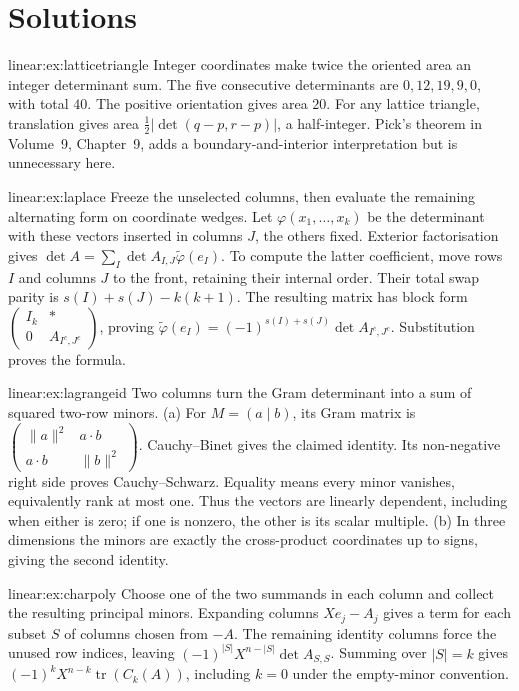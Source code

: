 \section{Solutions}
\begin{solution}{linear:ex:latticetriangle}
\idea Integer coordinates make twice the oriented area an integer determinant sum.
\writeup The five consecutive determinants are $0,12,19,9,0$, with total $40$. The positive orientation gives area $20$. For any lattice triangle, translation gives area $\tfrac12|\det(q-p,r-p)|$, a half-integer. Pick's theorem in Volume~9, Chapter~9, adds a boundary-and-interior interpretation but is unnecessary here.
\end{solution}
\begin{solution}{linear:ex:laplace}
\idea Freeze the unselected columns, then evaluate the remaining alternating form on coordinate wedges.
\writeup Let $\varphi(x_1,\ldots,x_k)$ be the determinant with these vectors inserted in columns $J$, the others fixed. Exterior factorisation gives $\det A=\sum_I\det A_{I,J}\tilde\varphi(e_I)$. To compute the latter coefficient, move rows $I$ and columns $J$ to the front, retaining their internal order. Their total swap parity is $s(I)+s(J)-k(k+1)$. The resulting matrix has block form $\begin{pmatrix}I_k&*\\0&A_{I^c,J^c}\end{pmatrix}$, proving $\tilde\varphi(e_I)=(-1)^{s(I)+s(J)}\det A_{I^c,J^c}$. Substitution proves the formula.
\end{solution}
\begin{solution}{linear:ex:lagrangeid}
\idea Two columns turn the Gram determinant into a sum of squared two-row minors.
\writeup (a) For $M=(a\mid b)$, its Gram matrix is $\begin{pmatrix}\|a\|^2&a\cdot b\\a\cdot b&\|b\|^2\end{pmatrix}$. Cauchy--Binet gives the claimed identity. Its non-negative right side proves Cauchy--Schwarz. Equality means every minor vanishes, equivalently rank at most one. Thus the vectors are linearly dependent, including when either is zero; if one is nonzero, the other is its scalar multiple. (b) In three dimensions the minors are exactly the cross-product coordinates up to signs, giving the second identity.
\end{solution}
\begin{solution}{linear:ex:charpoly}
\idea Choose one of the two summands in each column and collect the resulting principal minors.
\writeup Expanding columns $Xe_j-A_j$ gives a term for each subset $S$ of columns chosen from $-A$. The remaining identity columns force the unused row indices, leaving $(-1)^{|S|}X^{n-|S|}\det A_{S,S}$. Summing over $|S|=k$ gives $(-1)^kX^{n-k}\operatorname{tr}(C_k(A))$, including $k=0$ under the empty-minor convention.
\end{solution}
